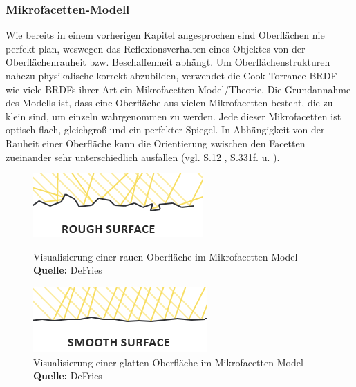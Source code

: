\documentclass[
  11pt,
  a4paper,
  oneside
  ]{article}
\begin{document}
\subsubsection{Mikrofacetten-Modell }
Wie bereits in einem vorherigen Kapitel angesprochen sind Oberflächen nie perfekt plan, weswegen das Reflexionsverhalten eines Objektes von der Oberflächenrauheit bzw. Beschaffenheit abhängt. Um Oberflächenstrukturen nahezu physikalische korrekt abzubilden, verwendet die Cook-Torrance BRDF wie viele BRDFs ihrer Art ein Mikro\-facetten-Model/Theorie. Die Grundannahme des Modells ist, dass eine Oberfläche aus vielen Mikrofacetten besteht, die zu klein sind, um einzeln wahrgenommen zu werden. Jede dieser Mikrofacetten ist optisch flach, gleichgroß und ein perfekter Spiegel. In Abhängigkeit von der Rauheit einer Oberfläche kann die Orientierung zwischen den Facetten zueinander sehr unterschiedlich ausfallen 
(vgl. S.12 \cite{rtrPaper}, S.331f. \cite{realTimeRendering4th} u. \cite{learnOpenGL}).
\begin{figure}[H]
  \centering
  \begin{minipage}{.48\textwidth}
    \centering
    \includegraphics*[width=1\linewidth]{images/microfacets_light_rays1.png}
    \caption{Visualisierung einer rauen Oberfläche im Mikro\-facetten-Model \footnotesize\textbf{Quelle:} DeFries \cite{learnOpenGL}}
    \label{fig:img2_1}
  \end{minipage}%
  \hfill
  \begin{minipage}{.48\textwidth}
    \centering
    \includegraphics*[width=1\linewidth]{images/microfacets_light_rays2.png}
    \caption{Visualisierung einer glatten Oberfläche im Mikro\-facetten-Model \footnotesize\textbf{Quelle:} DeFries \cite{learnOpenGL}}
    \label{fig:img2_2}
  \end{minipage}
\end{figure}
\end{document}
